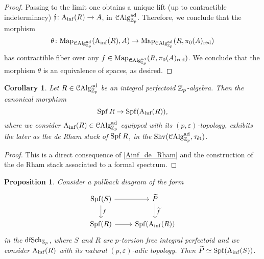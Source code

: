 \documentclass[10pt,a4paper]{amsart}
\numberwithin{equation}{subsection}
\newtheorem{corollary}[theorem]{Corollary}
\newtheorem{proposition}[theorem]{Proposition}
\theoremstyle{definition}
\begin{document}
\begin{proof}
    Passing to the limit one obtains a unique lift (up to contractible indeterminacy) $\mathfrak{f} \colon \mathrm{A}_{\mathrm{inf}}(R) \to A$, in $\mathcal C \mathrm{Alg}^{\mathrm{ad}}_{\mathbb Z_p}$.
    Therefore, we conclude that the morphism
        \[
            \theta \colon \mathrm{Map}_{\mathcal C \mathrm{Alg}^{\mathrm{ad}}_{\mathbb Z_p}}(\mathrm{A}_{\mathrm{inf}}(R), A) \to \mathrm{Map}_{\mathcal C \mathrm{Alg}^{\mathrm{ad}}_{\mathbb Z_p}} (R, \pi_0(A)_{\mathrm{red}})  
        \]
    has contractible fiber over any $f \in \mathrm{Map}_{\mathcal C \mathrm{Alg}^{\mathrm{ad}}_{\mathbb Z_p}} (R, \pi_0(A)_{\mathrm{red}})$. We conclude that the morphism $\theta$ is an equivalence of spaces, as desired.
\end{proof}


\begin{corollary}
    Let $R \in \mathcal C \mathrm{Alg}^{\mathrm{ad}}_{\mathbb Z_p}$ be an integral perfectoid $\mathbb Z_p$-algebra. Then the canonical morphism
        \[
            \operatorname{Spf} R \to \operatorname{Spf}(\mathrm{A}_{\mathrm{inf}}(R)),
        \]
    where we consider $\mathrm{A}_{\mathrm{inf}}(R) \in \mathcal C \mathrm{Alg}^{\mathrm{ad}}_{\mathbb Z_p}$ equipped with its $(p, \varepsilon)$-topology, exhibits the later as the \emph{de Rham} stack of $\operatorname{Spf} R$, in the \infcat $\mathrm{Shv}(\mathcal C \mathrm{Alg}^{\mathrm{ad}}_{\mathbb Z_p}, \tau_{\text{\'et}})$.
\end{corollary}

\begin{proof}
    This is a direct consequence of \cref{Ainf_de_Rham} and the construction of the de Rham stack associated to a formal spectrum.
\end{proof}

\begin{proposition}
Consider a pullback diagram of the form
    \[
    \begin{tikzcd}
            \Spf(S) \ar{r} \ar{d}{f} & \tP \ar{d}{\widetilde{f}} \\
            \Spf(R) \ar{r} & \Spf (\Ainf(R))
    \end{tikzcd}
    \]
in the \infcat $\mathrm{dfSch}_{\mathbb Z_p}$, where $S$ and $R$ are $p$-torsion free integral perfectoid and we consider $\mathrm{A}_{\mathrm{inf}}(R)$ with its natural $(p, \varepsilon)$-adic topology. Then $\widetilde{P} \simeq \operatorname{Spf} (\mathrm{A}_{\mathrm{inf}}(S))$. 
\end{proposition}
\end{document}
